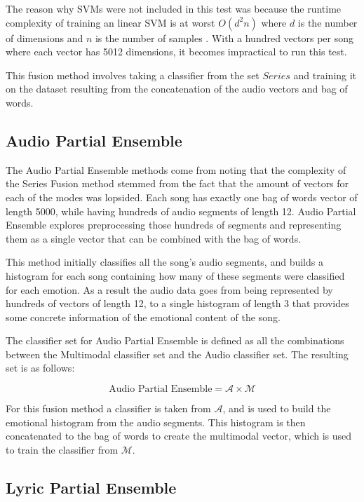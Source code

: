 The reason why SVMs were not included in this test was because 
the runtime complexity of training an linear SVM is at worst $O(d^2n)$ where $d$ is the number of dimensions and $n$ is the number of samples \cite{chapelle2007training}. 
With a hundred vectors per song where each vector has 5012 dimensions, it becomes impractical to run this test.

This fusion method involves taking a classifier from the set $Series$ and training it on the dataset resulting from the concatenation 
of the audio vectors and bag of words.  

\subsection{Audio Partial Ensemble}

The Audio Partial Ensemble methods come from noting that the complexity of the Series Fusion method stemmed from the 
fact that the amount of vectors for each of the modes was lopsided. Each song has exactly one bag of words vector of length 5000, while 
having hundreds of audio segments of length 12. Audio Partial Ensemble explores preprocessing those hundreds of segments and representing them as a single
vector that can be combined with the bag of words. 

This method initially classifies all the song's audio segments, and builds a histogram
for each song containing how many of these segments were classified for each emotion. 
As a result the audio data goes from being represented by hundreds of
vectors of length 12, to a single histogram of length 3 that provides some concrete information of the emotional content of the song. 

The classifier set for Audio Partial Ensemble is defined as all the combinations between the Multimodal classifier set and the Audio classifier set.  The resulting 
set is as follows: 

\[ \text{Audio Partial Ensemble} = \mathcal{A} \times \mathcal{M}   \]

For this fusion method a classifier is taken from $\mathcal{A}$, and is used to build the emotional histogram from the audio segments. This 
histogram is then concatenated to the bag of words to create the multimodal vector, which is used to train the classifier from $\mathcal{M}$.


\subsection{Lyric Partial Ensemble}

